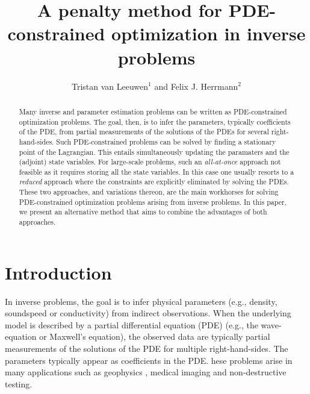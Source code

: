 \documentclass{iopart}
\begin{document}
\title[A penalty method for inverse problems]{A penalty method for PDE-constrained optimization in inverse problems}
\author{Tristan van Leeuwen$^1$ and Felix J. Herrmann$^2$}
\address{$^1$Department of Mathematics, Utrecht University, Utrecht, the Netherlands\\
$^2$ Dept. of Earth, Ocean and Atmospheric Sciences, University of British Columbia, Vancouver (BC), Canada.}

\begin{abstract}
Many inverse and parameter estimation problems can be written as PDE-constrained optimization problems. 
The goal, then, is to infer the parameters, typically coefficients of the PDE, from partial measurements
of the solutions of the PDEs for several right-hand-sides. Such PDE-constrained
problems can be solved by finding a stationary point of the Lagrangian. This entails simultaneously updating
the paramaters and the (adjoint) state variables. 
For large-scale problems, 
such an \emph{all-at-once} approach not feasible as it requires storing all the state variables. In this case one usually
resorts to a \emph{reduced} approach where the constraints are explicitly eliminated by solving the PDEs. These two approaches, 
and variations thereon, are the main workhorses for solving PDE-constrained optimization problems arising from inverse problems.
In this paper, we present an alternative method that aims to combine the advantages of both approaches.


\end{abstract}

\maketitle

\section{Introduction}
In inverse problems, the goal is to infer physical parameters (e.g., density, soundspeed or conductivity) 
from indirect observations. When the underlying model is described by a partial differential equation (PDE)
(e.g., the wave-equation or Maxwell's equation), the observed data are typically partial measurements
of the solutions of the PDE for multiple right-hand-sides. The parameters typically appear as coefficients in the PDE. 
hese problems arise in many applications such as
geophysics \cite{Haber2004,Epanomeritakis08}, medical imaging \cite{Abdoulaev2005} and non-destructive testing.
\end{document}
